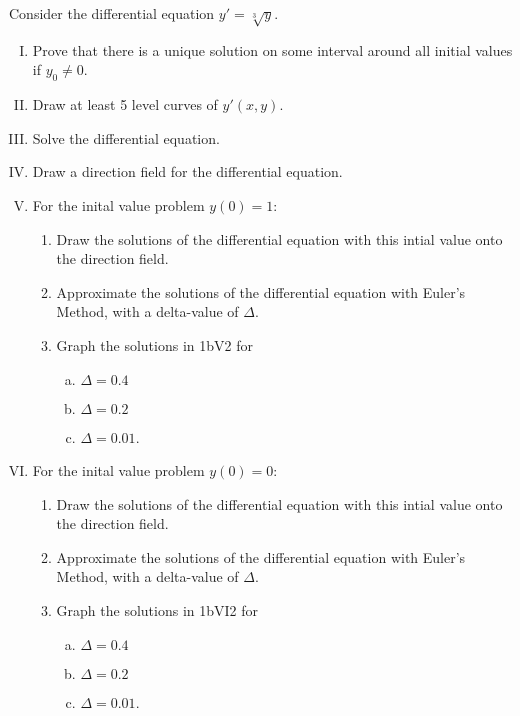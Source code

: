 \documentclass{article}
\begin{document}
    \begin{problem}[Problem 1b]
    Consider the differential equation $y' = \sqrt[3]{y}$.
        \begin{enumerate}[I.]
            \item Prove that there is a unique solution on some interval around all initial values if $y_0 \ne 0$.
            \item Draw at least 5 level curves of $y'(x,y)$.
            \item Solve the differential equation.
            \item Draw a direction field for the differential equation.
            \item For the inital value problem $y(0)=1$:
            \begin{enumerate}[1.]
                \item Draw the solutions of the differential equation with this 
                intial value onto the direction field.
                \item Approximate the solutions of the differential equation with Euler's Method,
                with a delta-value of $\Delta$. 
                \item Graph the solutions in 1bV2 for
                \begin{enumerate}[(a)]
                    \item $\Delta = 0.4$
                    \item $\Delta = 0.2$
                    \item $\Delta = 0.01$.
                \end{enumerate}
            \end{enumerate}
            \item For the inital value problem $y(0)=0$:
            \begin{enumerate}[1.]
                \item Draw the solutions of the differential equation with this 
                intial value onto the direction field.
                \item Approximate the solutions of the differential equation with Euler's Method,
                with a delta-value of $\Delta$. 
                \item Graph the solutions in 1bVI2 for
                \begin{enumerate}[(a)]
                    \item $\Delta = 0.4$
                    \item $\Delta = 0.2$
                    \item $\Delta = 0.01$.
                \end{enumerate}
            \end{enumerate}
        \end{enumerate}
\end{problem}
\end{document}
